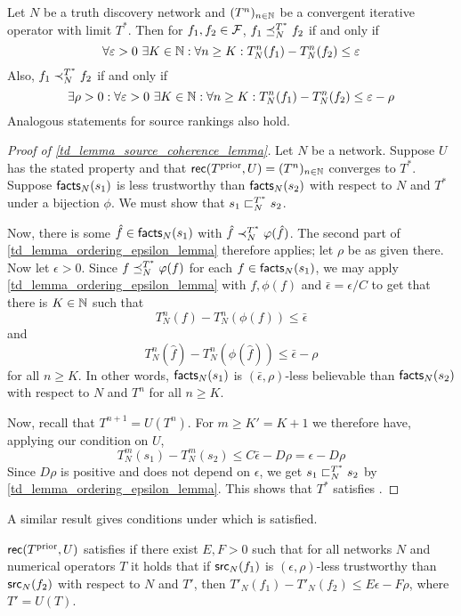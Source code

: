 \begin{lemma}
\label{td_lemma_ordering_epsilon_lemma}
Let $N$ be a truth discovery network and $(T^n)_{n \in \mathbb{N}}$ be a convergent
iterative operator with limit $T^*$. Then for $f_1, f_2 \in \mathcal{F}$, $f_1 \preceq_N^{T^*} f_2$
if and only if
\[
    \forall \varepsilon > 0\ \exists K \in \mathbb{N} : \forall n \ge K:
        T_N^n(f_1) - T_N^n(f_2) \le \varepsilon
\]
Also, $f_1 \prec_N^{T^*} f_2$ if and only if
\[
    \exists \rho > 0 : \forall \epsilon > 0\ \exists K \in \Nat : \forall n \ge K:
        T_N^n(f_1) - T_N^n(f_2) \le \epsilon - \rho
\]
Analogous statements for source rankings also hold.
\end{lemma}

\begin{proof}[Proof of \cref{td_lemma_source_coherence_lemma}]

Let $N$ be a network. Suppose $U$ has the stated property and that
$\mathsf{rec}(T^{\text{prior}}, U) = (T^n)_{n \in \mathbb{N}}$ converges to $T^*$. Suppose
$\mathsf{facts}_N(s_1)$ is less trustworthy than $\mathsf{facts}_N(s_2)$ with respect to $N$
and $T^*$ under a bijection $\phi$. We must show that $s_1 \sqsubset_N^{T^*} s_2$.

Now, there is some $\hat{f} \in \mathsf{facts}_N(s_1)$ with $\hat{f} \prec_N^{T^*}
\varphi(\hat{f})$. The second part of \cref{td_lemma_ordering_epsilon_lemma}
therefore applies; let $\rho$ be as given there. Now let $\epsilon > 0$.
Since $f \preceq_N^{T^*} \varphi(f)$ for each $f \in \mathsf{facts}_N(s_1)$, we may apply
\cref{td_lemma_ordering_epsilon_lemma} with $f, \phi(f)$ and
$\bar{\epsilon} = \epsilon / C$ to get that there is $K \in \mathbb{N}$ such that
\[
    T_N^n(f) - T_N^n(\phi(f)) \le \bar{\epsilon}
\]
and
\[
    T_N^n(\hat{f}) - T_N^n(\phi(\hat{f})) \le \bar{\epsilon} - \rho
\]
for all $n \ge K$. In other words, $\mathsf{facts}_N(s_1)$ is $(\bar{\epsilon},
\rho)$-less believable than $\mathsf{facts}_N(s_2)$ with respect to $N$ and $T^n$ for
all $n \ge K$.

Now, recall that $T^{n+1}=U(T^n)$. For $m \ge K' = K + 1$ we therefore have,
applying our condition on $U$,
\[
    T_N^m(s_1) - T_N^m(s_2) \le C\bar{\epsilon} - D\rho
    = \epsilon - D\rho
\]
Since $D\rho$ is positive and does not depend on $\epsilon$, we get $s_1
\sqsubset_N^{T^*} s_2$ by \cref{td_lemma_ordering_epsilon_lemma}. This shows that
    $T^*$ satisfies \sourcecoherence{}.
\end{proof}

A similar result gives conditions under which \factcoherence{} is satisfied.

\begin{lemma}
\label{td_lemma_fact_coherence_lemma}

    $\mathsf{rec}(T^{\text{prior}}, U)$ satisfies \factcoherence{} if there exist $E, F > 0$
such that for all networks $N$ and numerical operators $T$ it holds that if
$\mathsf{src}_N(f_1)$ is $(\epsilon, \rho)$-less trustworthy than $\mathsf{src}_N(f_2)$ with
respect to $N$ and $T'$, then
    $T'_N(f_1) - T'_N(f_2) \le E\epsilon - F\rho$,
where $T' = U(T)$.

\end{lemma}

